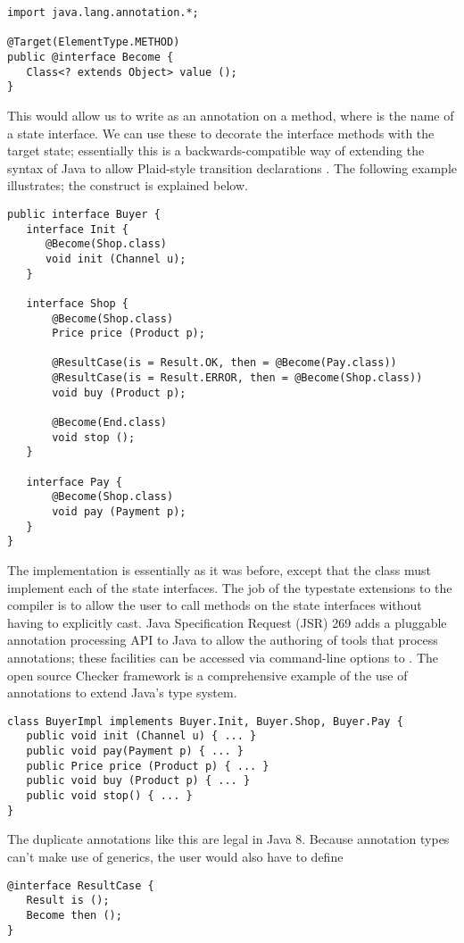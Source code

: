\begin{lstlisting}
import java.lang.annotation.*;

@Target(ElementType.METHOD)
public @interface Become {
   Class<? extends Object> value ();
}
\end{lstlisting}

\noindent This would allow us to write  as
an annotation on a method, where  is the name of a state
interface. We can use these to decorate the interface methods with the
target state; essentially this is a backwards-compatible way of
extending the syntax of Java to allow Plaid-style transition
declarations \cite{garcia14}. The following example illustrates; the
 construct is explained below.

\begin{lstlisting}
public interface Buyer {
   interface Init {
      @Become(Shop.class)
      void init (Channel u);
   }

   interface Shop {
       @Become(Shop.class)
       Price price (Product p);

       @ResultCase(is = Result.OK, then = @Become(Pay.class))
       @ResultCase(is = Result.ERROR, then = @Become(Shop.class))
       void buy (Product p);

       @Become(End.class)
       void stop ();
   }

   interface Pay {
       @Become(Shop.class)
       void pay (Payment p);
   }
}
\end{lstlisting}

\noindent The implementation is essentially as it was before, except
that the class  must implement each of the state
interfaces. The job of the typestate extensions to the compiler is to
allow the user to call methods on the state interfaces without having
to explicitly cast. Java Specification Request (JSR) 269 \cite{jsr269}
adds a pluggable annotation processing API to Java to allow the
authoring of tools that process annotations; these facilities can be
accessed via command-line options to . The open source
Checker framework \cite{papi08,dietl11} is a comprehensive example of
the use of annotations to extend Java's type system.

\begin{lstlisting}
class BuyerImpl implements Buyer.Init, Buyer.Shop, Buyer.Pay {
   public void init (Channel u) { ... }
   public void pay(Payment p) { ... }
   public Price price (Product p) { ... }
   public void buy (Product p) { ... }
   public void stop() { ... }
}
\end{lstlisting}

\noindent The duplicate annotations like this are legal in Java 8.
Because annotation types can't make use of generics, the user would
also have to define
\begin{lstlisting}
@interface ResultCase {
   Result is ();
   Become then ();
}
\end{lstlisting}
